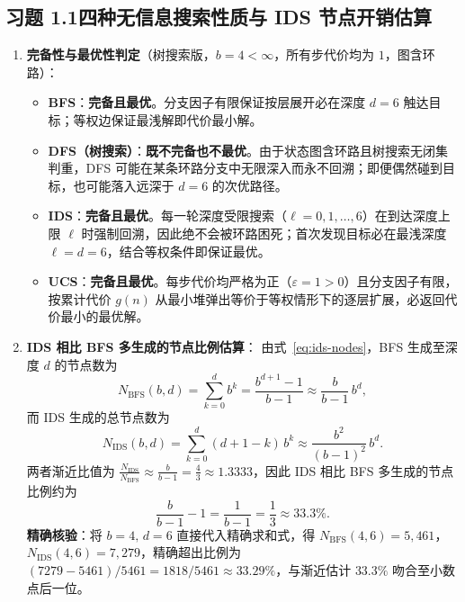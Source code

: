 \subsection*{习题 1.1\quad 四种无信息搜索性质与 IDS 节点开销估算}
\begin{enumerate}[label=(\arabic*), leftmargin=1.8em]
  \item \textbf{完备性与最优性判定}（树搜索版，$b=4<\infty$，所有步代价均为 $1$，图含环路）：
  \begin{itemize}
    \item \textbf{BFS}：\textbf{完备且最优}。分支因子有限保证按层展开必在深度 $d=6$ 触达目标；等权边保证最浅解即代价最小解。
    \item \textbf{DFS（树搜索）}：\textbf{既不完备也不最优}。由于状态图含环路且树搜索无闭集判重，DFS 可能在某条环路分支中无限深入而永不回溯；即便偶然碰到目标，也可能落入远深于 $d=6$ 的次优路径。
    \item \textbf{IDS}：\textbf{完备且最优}。每一轮深度受限搜索（$\ell = 0,1,\dots,6$）在到达深度上限 $\ell$ 时强制回溯，因此绝不会被环路困死；首次发现目标必在最浅深度 $\ell = d = 6$，结合等权条件即保证最优。
    \item \textbf{UCS}：\textbf{完备且最优}。每步代价均严格为正（$\varepsilon = 1 > 0$）且分支因子有限，按累计代价 $g(n)$ 从最小堆弹出等价于等权情形下的逐层扩展，必返回代价最小的最优解。
  \end{itemize}
  \item \textbf{IDS 相比 BFS 多生成的节点比例估算}：
  由式~\eqref{eq:ids-nodes}，BFS 生成至深度 $d$ 的节点数为
  \[
    N_{\text{BFS}}(b, d) = \sum_{k=0}^{d} b^k = \frac{b^{d+1}-1}{b-1} \approx \frac{b}{b-1}\, b^d,
  \]
  而 IDS 生成的总节点数为
  \[
    N_{\text{IDS}}(b, d) = \sum_{k=0}^{d} (d+1-k)\, b^k \approx \frac{b^2}{(b-1)^2}\, b^d.
  \]
  两者渐近比值为 $\frac{N_{\text{IDS}}}{N_{\text{BFS}}} \approx \frac{b}{b-1} = \frac{4}{3} \approx 1.3333$，因此 IDS 相比 BFS 多生成的节点比例约为
  \[
    \frac{b}{b-1} - 1 = \frac{1}{b-1} = \frac{1}{3} \approx \mathbf{33.3\%}.
  \]
  \textbf{精确核验}：将 $b=4,\, d=6$ 直接代入精确求和式，得 $N_{\text{BFS}}(4,6) = 5{,}461$，$N_{\text{IDS}}(4,6) = 7{,}279$，精确超出比例为 $(7279 - 5461)/5461 = 1818/5461 \approx \mathbf{33.29\%}$，与渐近估计 $33.3\%$ 吻合至小数点后一位。
\end{enumerate}

